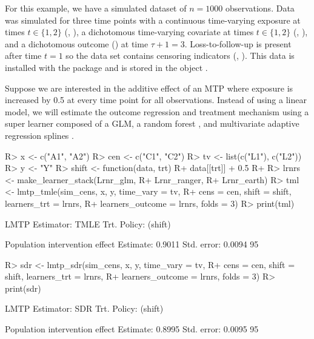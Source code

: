 \documentclass[]{jss}
\begin{document}
For this
example, we have a simulated dataset of \(n = 1000\) observations. Data
was simulated for three time points with a continuous time-varying
exposure at times \(t \in \{1, 2\}\) (, ), a
dichotomous time-varying covariate at times \(t \in \{1, 2\}\)
(, ), and a dichotomous outcome () at time
\(\tau + 1 = 3\). Loss-to-follow-up is present after time \(t = 1\) so the data set
contains censoring indicators (, ). This data is
installed with the package and is stored in the object .

Suppose we are interested in the additive effect of an MTP where exposure
is increased by 0.5 at every time point for all observations. Instead of using a linear model, 
we will estimate the outcome regression and treatment mechanism using a super learner 
composed of a GLM, a random forest \citep{wrightRanger}, 
and multivariate adaptive regression splines \citep{milborrowEarth}. 

\begin{CodeChunk}

\begin{CodeInput}
R> x <- c("A1", "A2")
R> cen <- c("C1", "C2")
R> tv <- list(c("L1"), c("L2"))
R> y <- "Y"
R> shift <- function(data, trt) {
R+   data[[trt]] + 0.5
R+ }
R> lrnrs <- make_learner_stack(Lrnr_glm,
R+                             Lrnr_ranger, 
R+                             Lrnr_earth)
R> tml <- lmtp_tmle(sim_cens, x, y, time_vary = tv, 
R+                  cens = cen, shift = shift, learners_trt = lrnrs, 
R+                  learners_outcome = lrnrs, folds = 3)
R> print(tml)
\end{CodeInput}

\begin{CodeOutput}
LMTP Estimator: TMLE
   Trt. Policy: (shift)

Population intervention effect
      Estimate: 0.9011
    Std. error: 0.0094
        95%
\end{CodeOutput}

\begin{CodeInput}
R> sdr <- lmtp_sdr(sim_cens, x, y, time_vary = tv, 
R+                 cens = cen, shift = shift, learners_trt = lrnrs, 
R+                 learners_outcome = lrnrs, folds = 3)
R> print(sdr)
\end{CodeInput}

\begin{CodeOutput}
LMTP Estimator: SDR
   Trt. Policy: (shift)

Population intervention effect
      Estimate: 0.8995
    Std. error: 0.0095
        95%
\end{CodeOutput}

\end{CodeChunk}
\end{document}

